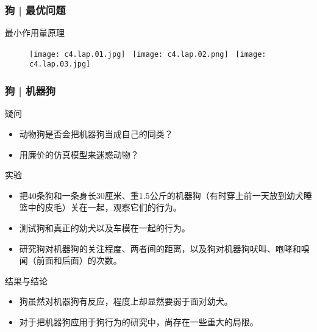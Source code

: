 \begin{frame}
  \frametitle{狗 | 最优问题}
  \begin{block}{最小作用量原理}
    \begin{figure}
      \centering
      \texttt{[image: c4.lap.01.jpg]} \ 
      \texttt{[image: c4.lap.02.png]} \ 
      \texttt{[image: c4.lap.03.jpg]}
    \end{figure}
  \end{block}
\end{frame}

\begin{frame}
  \frametitle{狗 | 机器狗}
  \begin{block}{疑问}
    \begin{itemize}
      \item 动物狗是否会把机器狗当成自己的同类？
      \item 用廉价的仿真模型来迷惑动物？
    \end{itemize}
  \end{block}
  \vspace{-0.5em}
  \pause
  \begin{block}{实验}
    \begin{itemize}
      \item 把40条狗和一条身长30厘米、重1.5公斤的机器狗（有时穿上前一天放到幼犬睡篮中的皮毛）关在一起，观察它们的行为。
      \item 测试狗和真正的幼犬以及车模在一起的行为。
      \item 研究狗对机器狗的关注程度、两者间的距离，以及狗对机器狗吠叫、咆哮和嗅闻（前面和后面）的次数。
    \end{itemize}
  \end{block}
  \vspace{-0.5em}
  \pause
  \begin{block}{结果与结论}
    \begin{itemize}
      \item 狗虽然对机器狗有反应，程度上却显然要弱于面对幼犬。
      \item 对于把机器狗应用于狗行为的研究中，尚存在一些重大的局限。
    \end{itemize}
  \end{block}
\end{frame}

